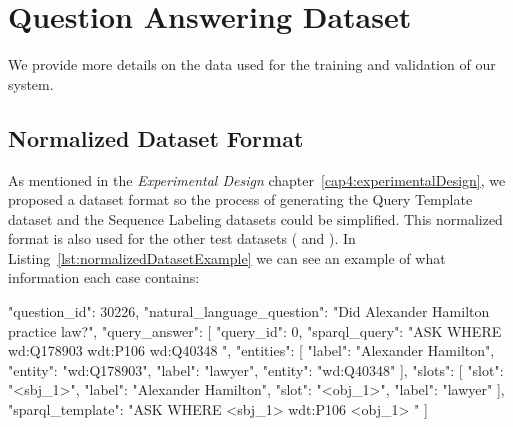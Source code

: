 \chapter{Question Answering Dataset}
\label{appendix:qaDataset}
We provide more details on the data used for the training and validation of our system.

\section{Normalized Dataset Format}
\label{appendix:qaDataset/normalizedFormat}
As mentioned in the \textit{Experimental Design} chapter~\ref{cap4:experimentalDesign}, we proposed 
a dataset format so the process 
of generating the Query Template dataset and the Sequence Labeling datasets could be simplified. This 
normalized format is also used for the other test datasets (\QALDseven{} and \WikiSPARQL{}). In 
Listing~\ref{lst:normalizedDatasetExample} we can see an example of what information each case contains:

\begin{sparqlcode}[%
    caption={Example of one \LCQuADtwo{} case following our proposed normalized format.}, 
    label={lst:normalizedDatasetExample}]
    "question_id": 30226,
    "natural_language_question": "Did Alexander Hamilton practice law?",
    "query_answer": [
        {
            "query_id": 0,
            "sparql_query": 
                "ASK WHERE { wd:Q178903 wdt:P106 wd:Q40348 }",
            "entities": [ 
                {"label": "Alexander Hamilton", "entity": "wd:Q178903"},
                {"label": "lawyer", "entity": "wd:Q40348"}
            ],
            "slots": [
                {"slot": "<sbj_1>", "label": "Alexander Hamilton"},
                {"slot": "<obj_1>", "label": "lawyer"}
            ],
            "sparql_template": "ASK WHERE { <sbj_1> wdt:P106 <obj_1> }"
        }
    ]
\end{sparqlcode}

